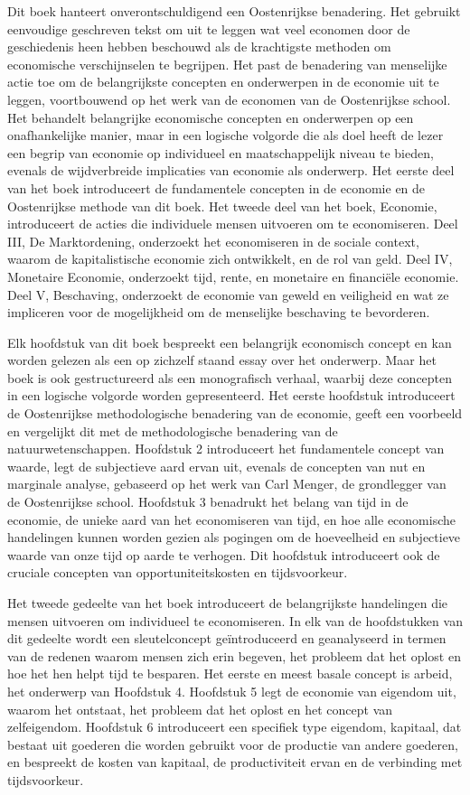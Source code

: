 Dit boek hanteert onverontschuldigend een Oostenrijkse benadering. Het gebruikt eenvoudige geschreven tekst om uit te leggen wat veel economen door de geschiedenis heen hebben beschouwd als de krachtigste methoden om economische verschijnselen te begrijpen. Het past de benadering van menselijke actie toe om de belangrijkste concepten en onderwerpen in de economie uit te leggen, voortbouwend op het werk van de economen van de Oostenrijkse school. Het behandelt belangrijke economische concepten en onderwerpen op een onafhankelijke manier, maar in een logische volgorde die als doel heeft de lezer een begrip van economie op individueel en maatschappelijk niveau te bieden, evenals de wijdverbreide implicaties van economie als onderwerp. Het eerste deel van het boek introduceert de fundamentele concepten in de economie en de Oostenrijkse methode van dit boek. Het tweede deel van het boek, Economie, introduceert de acties die individuele mensen uitvoeren om te economiseren. Deel III, De Marktordening, onderzoekt het economiseren in de sociale context, waarom de kapitalistische economie zich ontwikkelt, en de rol van geld. Deel IV, Monetaire Economie, onderzoekt tijd, rente, en monetaire en financiële economie. Deel V, Beschaving, onderzoekt de economie van geweld en veiligheid en wat ze impliceren voor de mogelijkheid om de menselijke beschaving te bevorderen.

Elk hoofdstuk van dit boek bespreekt een belangrijk economisch concept en kan worden gelezen als een op zichzelf staand essay over het onderwerp. Maar het boek is ook gestructureerd als een monografisch verhaal, waarbij deze concepten in een logische volgorde worden gepresenteerd. Het eerste hoofdstuk introduceert de Oostenrijkse methodologische benadering van de economie, geeft een voorbeeld en vergelijkt dit met de methodologische benadering van de natuurwetenschappen. Hoofdstuk 2 introduceert het fundamentele concept van waarde, legt de subjectieve aard ervan uit, evenals de concepten van nut en marginale analyse, gebaseerd op het werk van Carl Menger, de grondlegger van de Oostenrijkse school. Hoofdstuk 3 benadrukt het belang van tijd in de economie, de unieke aard van het economiseren van tijd, en hoe alle economische handelingen kunnen worden gezien als pogingen om de hoeveelheid en subjectieve waarde van onze tijd op aarde te verhogen. Dit hoofdstuk introduceert ook de cruciale concepten van opportuniteitskosten en tijdsvoorkeur.

Het tweede gedeelte van het boek introduceert de belangrijkste handelingen die mensen uitvoeren om individueel te economiseren. In elk van de hoofdstukken van dit gedeelte wordt een sleutelconcept geïntroduceerd en geanalyseerd in termen van de redenen waarom mensen zich erin begeven, het probleem dat het oplost en hoe het hen helpt tijd te besparen. Het eerste en meest basale concept is arbeid, het onderwerp van Hoofdstuk 4. Hoofdstuk 5 legt de economie van eigendom uit, waarom het ontstaat, het probleem dat het oplost en het concept van zelfeigendom. Hoofdstuk 6 introduceert een specifiek type eigendom, kapitaal, dat bestaat uit goederen die worden gebruikt voor de productie van andere goederen, en bespreekt de kosten van kapitaal, de productiviteit ervan en de verbinding met tijdsvoorkeur.

